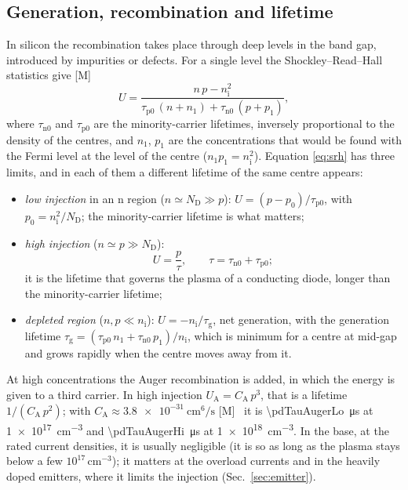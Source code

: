 \documentclass[10pt,a4paper]{scrartcl}
\newcommand{\ND}{N_\mathrm{D}}
\newcommand{\nint}{n_\mathrm{i}}
\newcommand{\cmc}{\si{\centi\metre^{-3}}}
\begin{document}
\subsection{Generation, recombination and lifetime}
\label{sec:lifetime}
In silicon the recombination takes place through deep levels in the band gap, introduced by impurities or defects. For a single level the Shockley--Read--Hall statistics give [M]~\cite{sze}
\begin{equation}
U = \frac{n\,p - \nint^2}{\tau_\mathrm{p0}\,(n + n_1) + \tau_\mathrm{n0}\,(p + p_1)} ,
\label{eq:srh}
\end{equation}
where $\tau_\mathrm{n0}$ and $\tau_\mathrm{p0}$ are the minority-carrier lifetimes, inversely proportional to the density of the centres, and $n_1$, $p_1$ are the concentrations that would be found with the Fermi level at the level of the centre ($n_1 p_1 = \nint^2$). Equation \eqref{eq:srh} has three limits, and in each of them a different lifetime of the same centre appears:
\begin{itemize}
\item \emph{low injection} in an n region ($n \simeq \ND \gg p$): $U = (p - p_0)/\tau_\mathrm{p0}$, with $p_0 = \nint^2/\ND$; the minority-carrier lifetime is what matters;
\item \emph{high injection} ($n \simeq p \gg \ND$):
\begin{equation}
U = \frac{p}{\tau} , \qquad \tau = \tau_\mathrm{n0} + \tau_\mathrm{p0} ;
\label{eq:tauhl}
\end{equation}
it is the lifetime that governs the plasma of a conducting diode, longer than the minority-carrier lifetime;
\item \emph{depleted region} ($n, p \ll \nint$): $U = -\nint/\tau_\mathrm{g}$, net generation, with the generation lifetime $\tau_\mathrm{g} = (\tau_\mathrm{p0}\,n_1 + \tau_\mathrm{n0}\,p_1)/\nint$, which is minimum for a centre at mid-gap and grows rapidly when the centre moves away from it.
\end{itemize}
At high concentrations the Auger recombination is added, in which the energy is given to a third carrier. In high injection $U_\mathrm{A} = C_\mathrm{A}\,p^3$, that is a lifetime $1/(C_\mathrm{A}\,p^2)$; with $C_\mathrm{A} \approx \SI{3.8e-31}{\centi\metre^6\per\second}$ [M]~\cite{lutz} it is \SI{\pdTauAugerLo}{\micro\second} at \SI{1e17}{\centi\metre^{-3}} and \SI{\pdTauAugerHi}{\micro\second} at \SI{1e18}{\centi\metre^{-3}}. In the base, at the rated current densities, it is usually negligible (it is so as long as the plasma stays below a few $10^{17}\,\cmc$); it matters at the overload currents and in the heavily doped emitters, where it limits the injection (Sec.~\ref{sec:emitter}).
\end{document}
